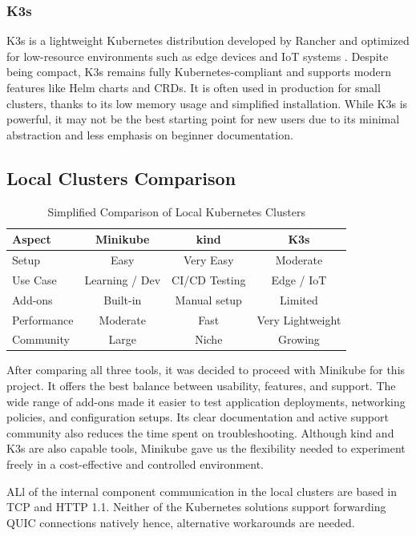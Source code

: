 \subsubsection{K3s}
K3s is a lightweight Kubernetes distribution developed by Rancher and optimized for low-resource environments such as edge devices and IoT systems \cite{k3s-docs}. Despite being compact, K3s remains fully Kubernetes-compliant and supports modern features like Helm charts and CRDs. It is often used in production for small clusters, thanks to its low memory usage and simplified installation. While K3s is powerful, it may not be the best starting point for new users due to its minimal abstraction and less emphasis on beginner documentation.

\subsection{Local Clusters Comparison}
\begin{table}[h]
\centering
\begin{tabular}{|l|c|c|c|}
\hline
\textbf{Aspect} & \textbf{Minikube} & \textbf{kind} & \textbf{K3s} \\
\hline
Setup & Easy & Very Easy & Moderate \\
Use Case & Learning / Dev & CI/CD Testing & Edge / IoT \\
Add-ons & Built-in & Manual setup & Limited \\
Performance & Moderate & Fast & Very Lightweight \\
Community & Large & Niche & Growing \\
\hline
\end{tabular}
\caption{Simplified Comparison of Local Kubernetes Clusters}
\end{table}


After comparing all three tools, it was decided to proceed with Minikube for this project. It offers the best balance between usability, features, and support. The wide range of add-ons made it easier to test application deployments, networking policies, and configuration setups. Its clear documentation and active support community also reduces the time spent on troubleshooting. Although kind and K3s are also capable tools, Minikube gave us the flexibility needed to experiment freely in a cost-effective and controlled environment.

ALl of the internal component communication in the local clusters are based in TCP and HTTP 1.1. Neither of the Kubernetes solutions support forwarding QUIC connections natively hence, alternative workarounds are needed.

